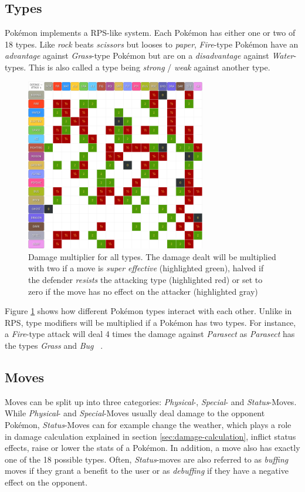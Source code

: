 \subsection{Types}
\label{sec:types}
Pokémon implements a \ac{RPS}-like system. Each Pokémon has either one or two of 
18 types. Like \emph{rock} beats \emph{scissors} but looses to \emph{paper}, \textit{Fire}-type Pokémon have an
\textit{advantage} against \textit{Grass}-type Pokémon but are on a \textit{disadvantage} against \textit{Water}-types.
This is also called a type being \textit{strong} / \textit{weak} against another type.
\begin{figure}
	\centering
	\includegraphics[width=0.7\textwidth]{images/type_chart.png}
	\caption{Damage multiplier for all types. The damage dealt will be multiplied with two if a move
	is \textit{super effective} (highlighted green), halved if the defender \textit{resists} the attacking
	type (highlighted red) or set to zero if the move has no effect on the attacker (highlighted 
	gray)~\autocite{Pokemondb:Type}}
	\label{fig:type_chart}
\end{figure}
Figure \ref{fig:type_chart} shows how different Pokémon types interact with each other.
Unlike in \ac{RPS}, type modifiers will be multiplied if a Pokémon has two types. For instance, a \textit{Fire}-type
attack will deal 4 times the damage against \textit{Parasect} as \textit{Parasect} has the types \textit{Grass} and
\textit{Bug} ~\autocite{Veekun:Parasect}.

\subsection{Moves}
\label{sec:moves}
Moves can be split up into three categories: \textit{Physical}-, \textit{Special}- and \textit{Status}-Moves.
While \textit{Physical}- and \textit{Special}-Moves usually deal damage to the opponent Pokémon, 
\textit{Status}-Moves can for example change the weather, which plays a role in damage calculation explained
in section \ref{sec:damage-calculation}, inflict status effects, raise or lower the stats of a Pokémon. In 
addition, a move also has exactly one of the 18 possible types. Often, \textit{Status}-moves are also referred
to as \textit{buffing} moves if they grant a benefit to the user or as \textit{debuffing} if they have a
negative effect on the opponent.

